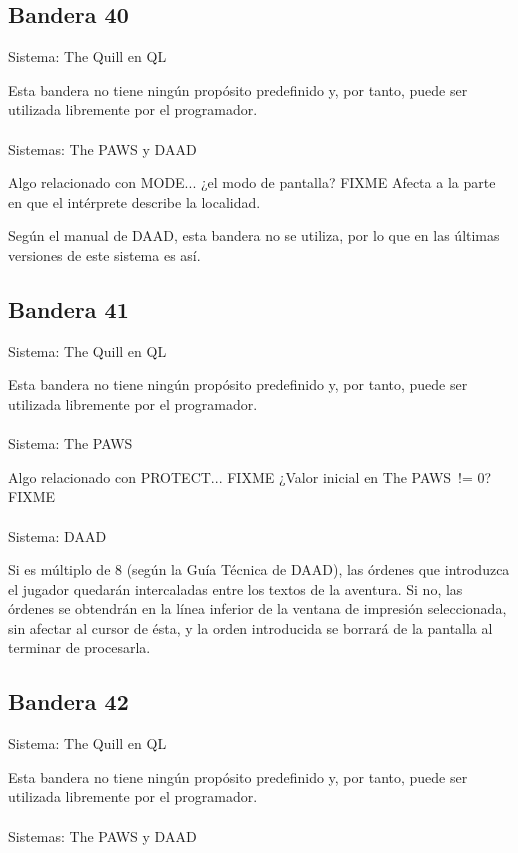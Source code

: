 \documentclass[11pt, a5paper]{article}
\newcommand{\quill}{\textsf{The Quill}\xspace}
\newcommand{\paw}{\textsf{The PAWS}\xspace}
\newcommand{\daad}{\textsf{DAAD}\xspace}
\newcommand{\sistema}[1]{\noindent Sistema: #1 \nopagebreak}
\newcommand{\sistemas}[1]{\noindent Sistemas: #1 \nopagebreak}
\begin{document}
\subsection{Bandera 40}

\sistema{\quill en QL}

Esta bandera no tiene ningún propósito predefinido y, por tanto, puede ser utilizada libremente por el programador.
\\\ \\
\sistemas{\paw y \daad}

Algo relacionado con MODE... ¿el modo de pantalla? FIXME
Afecta a la parte en que el intérprete describe la localidad.

Según el manual de \daad, esta bandera no se utiliza, por lo que en las últimas versiones de este sistema es así.

\subsection{Bandera 41}

\sistema{\quill en QL}

Esta bandera no tiene ningún propósito predefinido y, por tanto, puede ser utilizada libremente por el programador.
\\\ \\
\sistema{\paw}

Algo relacionado con PROTECT... FIXME
¿Valor inicial en \paw\ != 0? FIXME
\\\ \\
\sistema{\daad}

Si es múltiplo de 8 (según la Guía Técnica de \daad \cite[pág. 61]{DAAD}), las órdenes que introduzca el jugador quedarán intercaladas entre los textos de la aventura. Si no, las órdenes se obtendrán en la línea inferior de la ventana de impresión seleccionada, sin afectar al cursor de ésta, y la orden introducida se borrará de la pantalla al terminar de procesarla.

\subsection{Bandera 42}

\sistema{\quill en QL}

Esta bandera no tiene ningún propósito predefinido y, por tanto, puede ser utilizada libremente por el programador.
\\\ \\
\sistemas{\paw y \daad}
\end{document}
